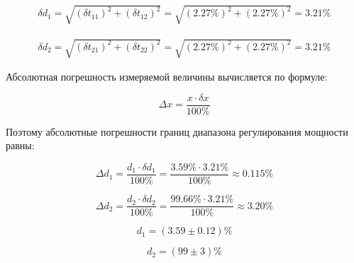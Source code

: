\begin{displaymath}
\begin{aligned}
	\delta d_1 = \sqrt{(\delta t_{11})^2 + (\delta t_{12})^2} = \sqrt{(2.27\%)^2 + (2.27\%)^2} = 3.21 \%
\end{aligned}
\end{displaymath}

\begin{displaymath}
\begin{aligned}
	\delta d_2 = \sqrt{(\delta t_{21})^2 + (\delta t_{22})^2} = \sqrt{(2.27\%)^2 + (2.27\%)^2} = 3.21 \%
\end{aligned}
\end{displaymath}

Абсолютная погрешность измеряемой величины вычисляется по формуле:

\begin{equation}
	\Delta x = \frac{x \cdot \delta x}{100 \%}
\end{equation}

Поэтому абсолютные погрешности границ диапазона регулирования мощности равны:

\begin{displaymath}
	\Delta d_1 = \frac{d_1 \cdot \delta d_1}{100 \%} = \frac{3.59 \% \cdot 3.21 \%}{100 \%} \approx 0.115 \%
\end{displaymath}

\begin{displaymath}
	\Delta d_2 = \frac{d_2 \cdot \delta d_2}{100 \%} = \frac{99.66 \% \cdot 3.21 \%}{100 \%} \approx 3.20 \%
\end{displaymath}

\begin{displaymath}
	d_1 = (3.59 \pm 0.12)\%
\end{displaymath}

\begin{displaymath}
	d_2 = (99 \pm 3)\%
\end{displaymath}


